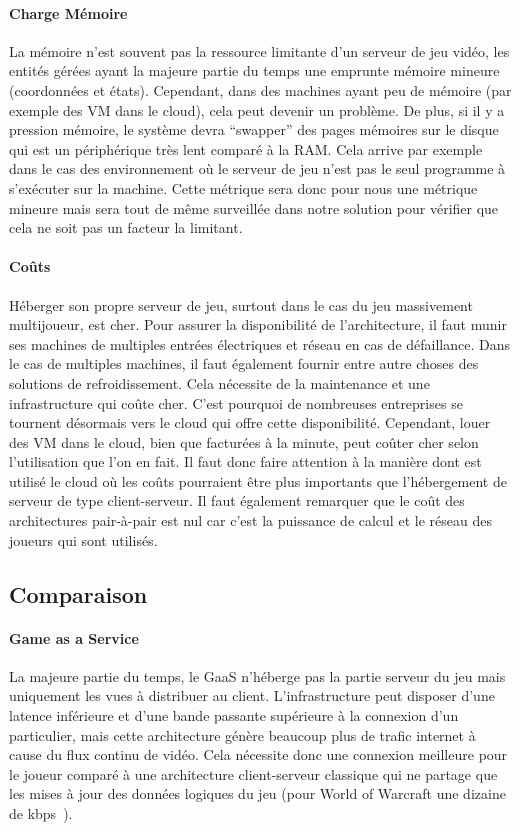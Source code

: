 \paragraph{Charge Mémoire\\}
La mémoire n'est souvent pas la ressource limitante d'un serveur de jeu vidéo, les entités gérées ayant la majeure partie du temps une emprunte mémoire mineure (coordonnées et états). Cependant, dans des machines ayant peu de mémoire (par exemple des VM dans le cloud), cela peut devenir un problème. De plus, si il y a pression mémoire, le système devra ``swapper'' des pages mémoires sur le disque qui est un périphérique très lent comparé à la RAM. Cela arrive par exemple dans le cas des environnement où le serveur de jeu n'est pas le seul programme à s'exécuter sur la machine. Cette métrique sera donc pour nous une métrique mineure mais sera tout de même surveillée dans notre solution pour vérifier que cela ne soit pas un facteur la limitant.

\paragraph{Coûts\\}
Héberger son propre serveur de jeu, surtout dans le cas du jeu massivement multijoueur, est cher. Pour assurer la disponibilité de l'architecture, il faut munir ses machines de multiples entrées électriques et réseau en cas de défaillance. Dans le cas de multiples machines, il faut également fournir entre autre choses des solutions de refroidissement. Cela nécessite de la maintenance et une infrastructure qui coûte cher. C'est pourquoi de nombreuses entreprises se tournent désormais vers le cloud qui offre cette disponibilité. Cependant, louer des VM dans le cloud, bien que facturées à la minute, peut coûter cher selon l'utilisation que l'on en fait. Il faut donc faire attention à la manière dont est utilisé le cloud où les coûts pourraient être plus importants que l'hébergement de serveur de type client-serveur. Il faut également remarquer que le coût des architectures pair-à-pair est nul car c'est la puissance de calcul et le réseau des joueurs qui sont utilisés.

\subsection{Comparaison}
\paragraph{Game as a Service\\}
La majeure partie du temps, le GaaS n'héberge pas la partie serveur du jeu mais uniquement les vues à distribuer au client. L'infrastructure peut disposer d'une latence inférieure et d'une bande passante supérieure à la connexion d'un particulier, mais cette architecture génère beaucoup plus de trafic internet à cause du flux continu de vidéo. Cela nécessite donc une connexion meilleure pour le joueur comparé à une architecture client-serveur classique qui ne partage que les mises à jour des données logiques du jeu (pour World of Warcraft une dizaine de kbps~\cite{mmorpg_network_performance_session_patterns_and_latency_requirements_analysis}).

